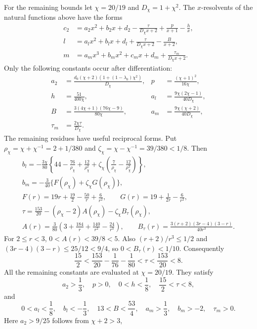 For the remaining bounds let $\chi=20/19$ and $D_\chi=1+\chi^2$.
The $x$-resolvents of the natural functions above have the forms
\begin{align*}
 c_2&=a_2x^2+b_2x+d_2-\frac{\tau}{D_\chi x+2}
                    +\frac p{x+1}-\frac h x,\\
 l&=a_lx^2+b_lx+d_l+\frac{\tau}{D_\chi x+2}-\frac B{x+2},\\
 m&=a_mx^3+b_mx^2+c_mx+d_m+\frac{\tau_m}{D_\chi x+2}.
\end{align*}
Only the following constants occur after differentiation:
\begin{align*}
 a_2&=\frac{d_0(\chi+2)(1+(1-\lambda_0)\chi^2)}{D_\chi},&
 p&=\frac{(\chi+1)^2}{16\chi},\\
 h&=\frac{51}{400\chi},&
 a_l&=\frac{9\chi(2\chi-1)}{40D_\chi},\\
 B&=\frac{3(4\chi+1)(76\chi-9)}{80\chi},&
 a_m&=\frac{9\chi(\chi+2)}{40D_\chi},\\
 \tau_m&=\frac{2\chi\tau}{D_\chi}.
\end{align*}
The remaining residues have useful reciprocal forms. Put
$\rho_\chi=\chi+\chi^{-1}=2+1/380$ and
$\zeta_\chi=\chi-\chi^{-1}=39/380<1/8$. Then
\begin{gather*}
 b_l=-\frac{3\chi}{80}\left\{44-\frac{76}{\rho_\chi}
       +\frac{12}{\rho_\chi^2}
       +\zeta_\chi\left(\frac7{\rho_\chi}
                            -\frac{12}{\rho_\chi^2}\right)\right\},\\
 b_m=-\frac3{40}\{F(\rho_\chi)+\zeta_\chi G(\rho_\chi)\},\\
 F(r)=19r+\frac{19}{2}-\frac{50}{r}+\frac6{r^2},\qquad
 G(r)=19+\frac1{2r}-\frac6{r^2},\\
 \tau=\frac{153}{20}-(\rho_\chi-2)A(\rho_\chi)
                         -\zeta_\chi B_\tau(\rho_\chi),\\
 A(r)=\frac3{80}\left(3+\frac{184}{r}+\frac{140}{r^2}
                                  -\frac{24}{r^3}\right),\qquad
 B_\tau(r)=\frac{3(r+2)(3r-4)(3-r)}{40r^3}.
\end{gather*}
For $2\le r<3$, $0<A(r)<39/8<5$. Also $(r+2)/r^3\le1/2$ and
$(3r-4)(3-r)\le25/12<9/4$, so $0<B_\tau(r)<1/10$.
Consequently
\[
 \frac{15}{2}<\frac{153}{20}-\frac1{76}-\frac1{80}
                  <\tau<\frac{153}{20}<8.
\]
All the remaining constants are evaluated at $\chi=20/19$.
They satisfy
\[
 a_2>\frac13,\quad p>0,\quad 0<h<\frac18,\quad
 \frac{15}{2}<\tau<8,
\]
and
\[
 0<a_l<\frac18,\quad b_l<-\frac13,\quad 13<B<\frac{53}{4},\quad
 a_m>\frac13,\quad b_m>-2,\quad\tau_m>0.
\]
Here $a_2>9/25$ follows from $\chi+2>3$,
